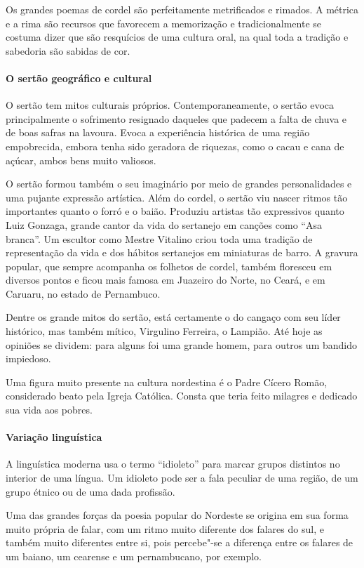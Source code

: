 \documentclass[11pt]{extarticle}
\begin{document}
Os grandes poemas de cordel são perfeitamente metrificados e rimados. A métrica
e a rima são recursos que favorecem a memorização e tradicionalmente se costuma
dizer que são resquícios de uma cultura oral, na qual toda a tradição e
sabedoria são sabidas de cor.  


\paragraph{O sertão geográfico e cultural}

O sertão tem mitos culturais próprios. Contemporaneamente, o sertão evoca
principalmente o sofrimento resignado daqueles que padecem a falta de chuva e
de boas safras na lavoura. Evoca a experiência histórica de uma região
empobrecida, embora tenha sido geradora de riquezas, como o cacau e cana de
açúcar, ambos bens muito valiosos. 

O sertão formou também o seu imaginário por meio de grandes personalidades e
uma pujante expressão artística. Além do cordel, o sertão viu nascer ritmos tão
importantes quanto o forró e o baião. Produziu artistas tão expressivos quanto
Luiz Gonzaga, grande cantor da vida do sertanejo em canções como “Asa branca”.
Um escultor como Mestre Vitalino criou toda uma tradição de representação da
vida e dos hábitos sertanejos em miniaturas de barro. A gravura popular, que
sempre acompanha os folhetos de cordel, também floresceu em diversos pontos e
ficou mais famosa em Juazeiro do Norte, no Ceará, e em Caruaru, no estado de
Pernambuco. 

Dentre os grande mitos do sertão, está certamente o do cangaço com seu líder
histórico, mas também mítico, Virgulino Ferreira, o Lampião. Até hoje as
opiniões se dividem: para alguns foi uma grande homem, para outros um bandido
impiedoso. 

Uma figura muito presente na cultura nordestina é o Padre Cícero Romão,
considerado beato pela Igreja Católica. Consta que teria feito milagres e
dedicado sua vida aos pobres. 

\paragraph{Variação linguística}

A linguística moderna usa o termo “idioleto” para marcar grupos distintos no
interior de uma língua. Um idioleto pode ser a fala peculiar de uma região, de
um grupo étnico ou de uma dada profissão. 

Uma das grandes forças da poesia popular do Nordeste se origina em sua forma
muito própria de falar, com um ritmo muito diferente dos falares do sul, e
também muito diferentes entre si, pois percebe"-se a diferença entre os falares
de um baiano, um cearense e um pernambucano, por exemplo.
\end{document}
